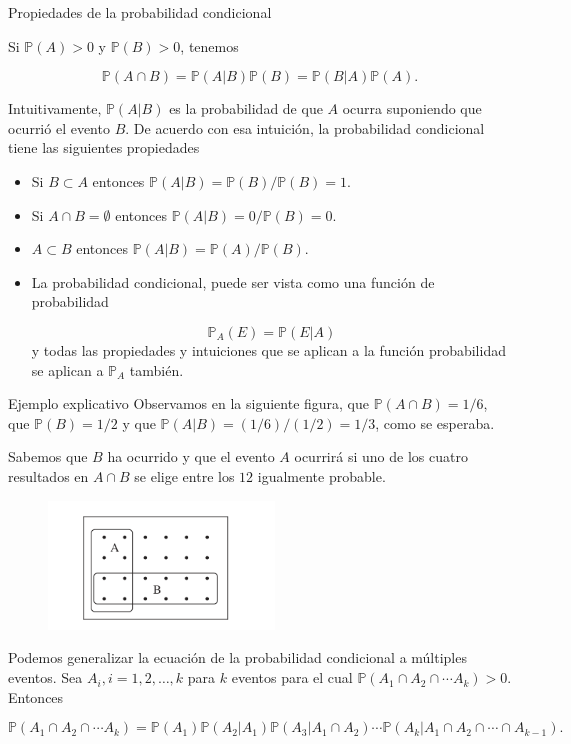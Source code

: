 \documentclass[10pt]{beamer}
\begin{document}
 \begin{frame}{Propiedades de la probabilidad condicional }
\small {Si $\mathbb{P}(A) > 0$ y $\mathbb{P}(B) > 0$, tenemos
 
 \[
 \mathbb{P}(A\cap B)=\mathbb{P}(A|B)\mathbb{P}(B)=\mathbb{P}(B|A)\mathbb{P}(A).
 \]
 
 \vspace{0.3cm}
 
 Intuitivamente, $\mathbb{P}(A | B)$ es la probabilidad de que $A$ ocurra suponiendo que ocurri\'o el evento $B$. De acuerdo con esa intuici\'on, la probabilidad condicional tiene las siguientes propiedades}
 
 \begin{itemize}
 	\item Si $B \subset A$ entonces $\mathbb{P}(A| B)=\mathbb{P}(B)/\mathbb{P}(B)=1$.
 	\item Si $A \cap B = \emptyset$ entonces $\mathbb{P}(A | B)=0/\mathbb{P}(B)=0$.
 	\item $A \subset B$ entonces $\mathbb{P}(A| B)=\mathbb{P}(A)/\mathbb{P}(B)$.
 	\item La probabilidad condicional, puede ser vista como una funci\'on de probabilidad
 	
 	\[
 	\mathbb{P}_A(E)  =  \mathbb{P}(E | A)
 	\]
 	y todas las propiedades y intuiciones que se aplican a la funci\'on probabilidad se aplican a $\mathbb{P}_A$ tambi\'en.
 \end{itemize}
\end{frame}
\begin{frame}{Ejemplo explicativo }
Observamos en la siguiente figura, que $\mathbb{P}(A \cap B) = 1/6$, que $\mathbb{P}(B) = 1/2$ y que $\mathbb{P}(A|B) = (1/6)/(1/2) = 1/3$, como se esperaba.

Sabemos que $B$ ha ocurrido y que el evento $A$ ocurrir\'a si uno de los cuatro resultados en $A \cap B$ se elige entre los $12$ igualmente probable.

\begin{figure}[h]
	\centering
	\includegraphics[width=6cm]{g1}
\end{figure}

\scriptsize{Podemos generalizar la ecuaci\'on de la probabilidad condicional a m\'ultiples eventos. Sea $A_i, i = 1,2, \dots, k$ para $k$ eventos para el cual $\mathbb{P}(A_1 \cap A_2 \cap \cdots A_k) > 0$. Entonces

\[
\mathbb{P}(A_1 \cap A_2 \cap \cdots A_k) = \mathbb{P}(A_1)\mathbb{P}(A_2|A_1)\mathbb{P}(A_3|A_1 \cap A_2)\cdots \mathbb{P}(A_k|A_1 \cap A_2 \cap \cdots \cap A_{k -1}).
\]
}
\end{frame}
\end{document}
